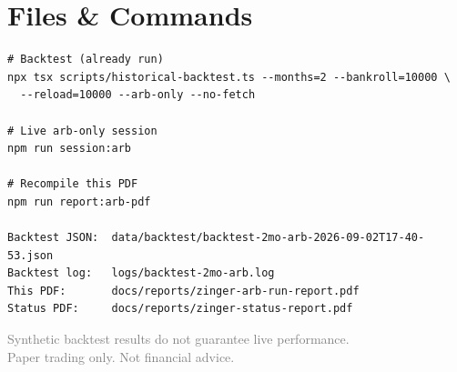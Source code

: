 \documentclass[11pt,a4paper]{article}
\begin{document}
\section{Files \& Commands}

\begin{verbatim}
# Backtest (already run)
npx tsx scripts/historical-backtest.ts --months=2 --bankroll=10000 \
  --reload=10000 --arb-only --no-fetch

# Live arb-only session
npm run session:arb

# Recompile this PDF
npm run report:arb-pdf

Backtest JSON:  data/backtest/backtest-2mo-arb-2026-09-02T17-40-53.json
Backtest log:   logs/backtest-2mo-arb.log
This PDF:       docs/reports/zinger-arb-run-report.pdf
Status PDF:     docs/reports/zinger-status-report.pdf
\end{verbatim}

\vfill
\begin{center}
\small
\textcolor{gray}{Synthetic backtest results do not guarantee live performance.\\
Paper trading only. Not financial advice.}
\end{center}
\end{document}
